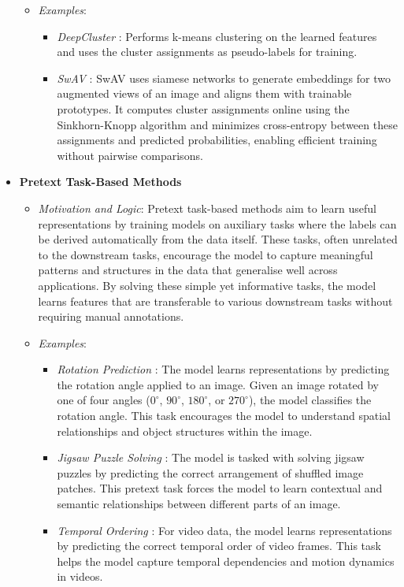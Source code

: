 \begin{itemize}
\begin{itemize}
        \item \emph{Examples}:
        \begin{itemize}
            \item \emph{DeepCluster} \citep{caron2018deep}: Performs k-means clustering on the learned features and uses the cluster assignments as pseudo-labels for training.
            \item \emph{SwAV} \citep{caron2020unsupervised}: SwAV uses siamese networks to generate embeddings for two augmented views of an image and aligns them with trainable prototypes. It computes cluster assignments online using the Sinkhorn-Knopp algorithm and minimizes cross-entropy between these assignments and predicted probabilities, enabling efficient training without pairwise comparisons.
        \end{itemize}
    \end{itemize}
    \item \textbf{Pretext Task-Based Methods}
    \begin{itemize}
         \item \emph{Motivation and Logic}: Pretext task-based methods aim to learn useful representations by training models on auxiliary tasks where the labels can be derived automatically from the data itself. These tasks, often unrelated to the downstream tasks, encourage the model to capture meaningful patterns and structures in the data that generalise well across applications. By solving these simple yet informative tasks, the model learns features that are transferable to various downstream tasks without requiring manual annotations.

    \item \emph{Examples}:
    \begin{itemize}
        \item \emph{Rotation Prediction} \citep{gidaris2018unsupervised}: The model learns representations by predicting the rotation angle applied to an image. Given an image rotated by one of four angles (\(0^\circ\), \(90^\circ\), \(180^\circ\), or \(270^\circ\)), the model classifies the rotation angle. This task encourages the model to understand spatial relationships and object structures within the image.

        \item \emph{Jigsaw Puzzle Solving} \citep{noroozi2016unsupervised}: The model is tasked with solving jigsaw puzzles by predicting the correct arrangement of shuffled image patches. This pretext task forces the model to learn contextual and semantic relationships between different parts of an image.
        
        \item \emph{Temporal Ordering} \citep{misra2016shuffle}: For video data, the model learns representations by predicting the correct temporal order of video frames. This task helps the model capture temporal dependencies and motion dynamics in videos.
    \end{itemize}
    \end{itemize}

\end{itemize}


